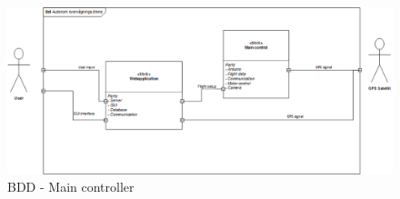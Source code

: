 \begin{figure}[H]
\centering
\includegraphics[width=1\textwidth]{Billeder/IBD/ibd_generel}
\caption{BDD - Main controller}
\label{fig:bdd_maincontroller}
\end{figure}
